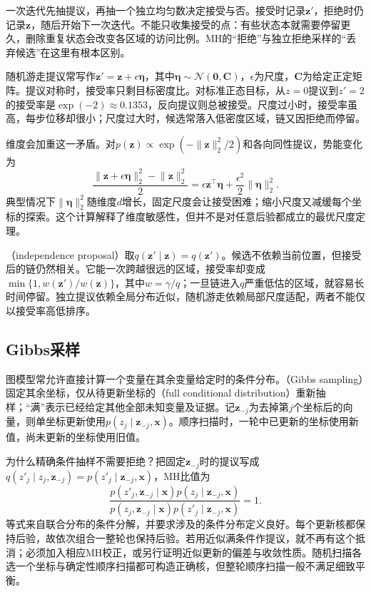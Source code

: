 一次迭代先抽提议，再抽一个独立均匀数决定接受与否。接受时记录$\bm{z}'$，拒绝时仍记录$\bm{z}$，随后开始下一次迭代。不能只收集接受的点：有些状态本就需要停留更久，删除重复状态会改变各区域的访问比例。MH的“拒绝”与独立拒绝采样的“丢弃候选”在这里有根本区别。

随机游走提议常写作$\bm{z}'=\bm{z}+\epsilon\bm{\eta}$，其中$\bm{\eta}\sim\mathcal{N}(\bm{0},\bm{C})$，$\epsilon$为尺度，$\bm{C}$为给定正定矩阵。提议对称时，接受率只剩目标密度比。对标准正态目标，从$z=0$提议到$z'=2$的接受率是$\exp(-2)\approx0.1353$，反向提议则总被接受。尺度过小时，接受率虽高，每步位移却很小；尺度过大时，候选常落入低密度区域，链又因拒绝而停留。

维度会加重这一矛盾。对$p(\bm{z})\propto\exp(-\lVert\bm{z}\rVert_2^2/2)$和各向同性提议，势能变化为
\[
  \frac{\lVert\bm{z}+\epsilon\bm{\eta}\rVert_2^2
             -\lVert\bm{z}\rVert_2^2}{2}
    =\epsilon\bm{z}^{\top}\bm{\eta}
       +\frac{\epsilon^2}{2}\lVert\bm{\eta}\rVert_2^2.
\]
典型情况下$\lVert\bm{\eta}\rVert_2^2$随维度$d$增长，固定尺度会让接受困难；缩小尺度又减缓每个坐标的探索。这个计算解释了维度敏感性，但并不是对任意后验都成立的最优尺度定理。

（independence proposal）取$q(\bm{z}'\mid\bm{z})=q(\bm{z}')$。候选不依赖当前位置，但接受后的链仍然相关。它能一次跨越很远的区域，接受率却变成$\min\{1,w(\bm{z}')/w(\bm{z})\}$，其中$w=\gamma/q$；一旦链进入$q$严重低估的区域，就容易长时间停留。独立提议依赖全局分布近似，随机游走依赖局部尺度适配，两者不能仅以接受率高低排序。

\subsection{Gibbs采样}
\label{sec:pgm-sampling-gibbs}

图模型常允许直接计算一个变量在其余变量给定时的条件分布。（Gibbs sampling）固定其余坐标，仅从待更新坐标的（full conditional distribution）重新抽样；“满”表示已经给定其他全部未知变量及证据。记$\bm{z}_{-j}$为去掉第$j$个坐标后的向量，则单坐标更新使用$p(z_j\mid\bm{z}_{-j},\bm{x})$。顺序扫描时，一轮中已更新的坐标使用新值，尚未更新的坐标使用旧值。

为什么精确条件抽样不需要拒绝？把固定$\bm{z}_{-j}$时的提议写成$q(z'_j\mid z_j,\bm{z}_{-j})=p(z'_j\mid\bm{z}_{-j},\bm{x})$，MH比值为
\begin{equation}
  \frac{p(z'_j,\bm{z}_{-j}\mid\bm{x})p(z_j\mid\bm{z}_{-j},\bm{x})}
       {p(z_j,\bm{z}_{-j}\mid\bm{x})p(z'_j\mid\bm{z}_{-j},\bm{x})}
    =1.
  \label{eq:pgm-sampling-gibbs-acceptance}
\end{equation}
等式来自联合分布的条件分解，并要求涉及的条件分布定义良好。每个更新核都保持后验，故依次组合一整轮也保持后验。若用近似满条件作提议，就不再有这个抵消；必须加入相应MH校正，或另行证明近似更新的偏差与收敛性质。随机扫描各选一个坐标与确定性顺序扫描都可构造正确核，但整轮顺序扫描一般不满足细致平衡。

